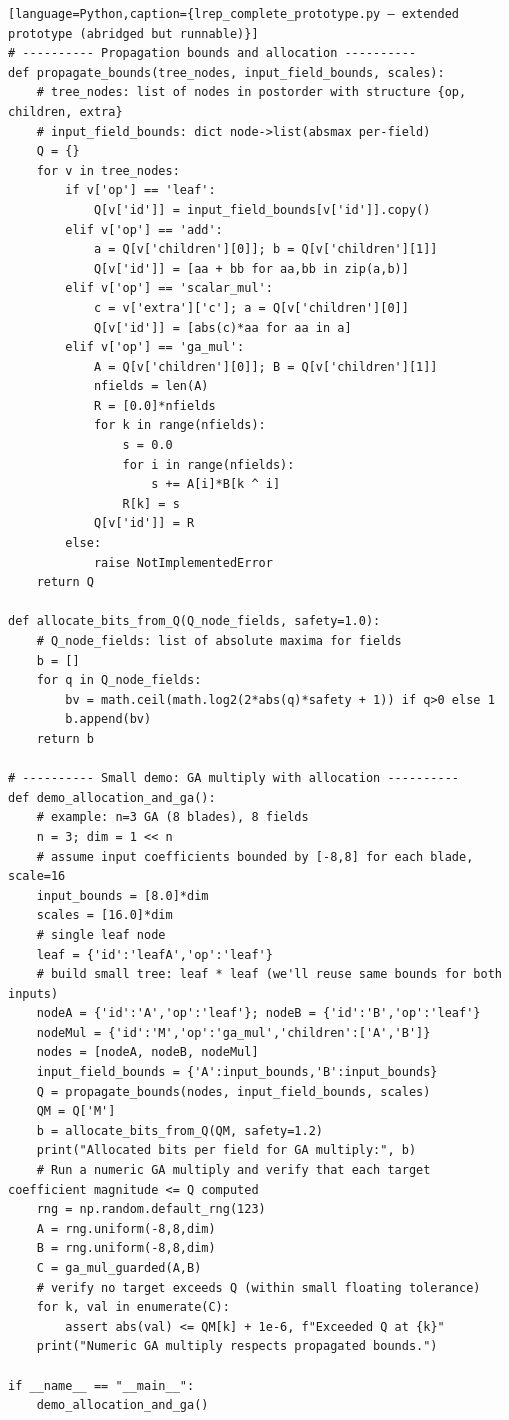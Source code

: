 \documentclass[11pt]{article}
\theoremstyle{definition}
\theoremstyle{plain}
\begin{document}
\begin{verbatim}[language=Python,caption={lrep_complete_prototype.py — extended prototype (abridged but runnable)}]
# ---------- Propagation bounds and allocation ----------
def propagate_bounds(tree_nodes, input_field_bounds, scales):
    # tree_nodes: list of nodes in postorder with structure {op, children, extra}
    # input_field_bounds: dict node->list(absmax per-field)
    Q = {}
    for v in tree_nodes:
        if v['op'] == 'leaf':
            Q[v['id']] = input_field_bounds[v['id']].copy()
        elif v['op'] == 'add':
            a = Q[v['children'][0]]; b = Q[v['children'][1]]
            Q[v['id']] = [aa + bb for aa,bb in zip(a,b)]
        elif v['op'] == 'scalar_mul':
            c = v['extra']['c']; a = Q[v['children'][0]]
            Q[v['id']] = [abs(c)*aa for aa in a]
        elif v['op'] == 'ga_mul':
            A = Q[v['children'][0]]; B = Q[v['children'][1]]
            nfields = len(A)
            R = [0.0]*nfields
            for k in range(nfields):
                s = 0.0
                for i in range(nfields):
                    s += A[i]*B[k ^ i]
                R[k] = s
            Q[v['id']] = R
        else:
            raise NotImplementedError
    return Q

def allocate_bits_from_Q(Q_node_fields, safety=1.0):
    # Q_node_fields: list of absolute maxima for fields
    b = []
    for q in Q_node_fields:
        bv = math.ceil(math.log2(2*abs(q)*safety + 1)) if q>0 else 1
        b.append(bv)
    return b

# ---------- Small demo: GA multiply with allocation ----------
def demo_allocation_and_ga():
    # example: n=3 GA (8 blades), 8 fields
    n = 3; dim = 1 << n
    # assume input coefficients bounded by [-8,8] for each blade, scale=16
    input_bounds = [8.0]*dim
    scales = [16.0]*dim
    # single leaf node
    leaf = {'id':'leafA','op':'leaf'}
    # build small tree: leaf * leaf (we'll reuse same bounds for both inputs)
    nodeA = {'id':'A','op':'leaf'}; nodeB = {'id':'B','op':'leaf'}
    nodeMul = {'id':'M','op':'ga_mul','children':['A','B']}
    nodes = [nodeA, nodeB, nodeMul]
    input_field_bounds = {'A':input_bounds,'B':input_bounds}
    Q = propagate_bounds(nodes, input_field_bounds, scales)
    QM = Q['M']
    b = allocate_bits_from_Q(QM, safety=1.2)
    print("Allocated bits per field for GA multiply:", b)
    # Run a numeric GA multiply and verify that each target coefficient magnitude <= Q computed
    rng = np.random.default_rng(123)
    A = rng.uniform(-8,8,dim)
    B = rng.uniform(-8,8,dim)
    C = ga_mul_guarded(A,B)
    # verify no target exceeds Q (within small floating tolerance)
    for k, val in enumerate(C):
        assert abs(val) <= QM[k] + 1e-6, f"Exceeded Q at {k}"
    print("Numeric GA multiply respects propagated bounds.")

if __name__ == "__main__":
    demo_allocation_and_ga()
\end{verbatim}
\end{document}
